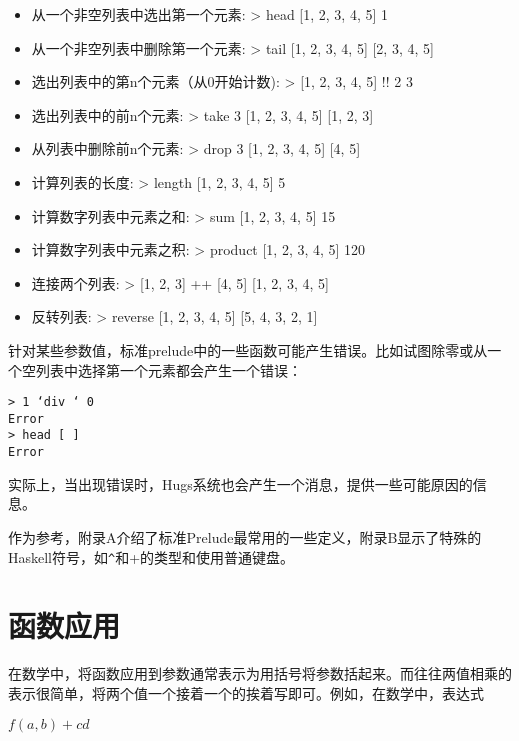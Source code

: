 \begin{itemize}
\item 从一个非空列表中选出第一个元素:
> head [1, 2, 3, 4, 5]
1

\item 从一个非空列表中删除第一个元素:
> tail [1, 2, 3, 4, 5]
[2, 3, 4, 5]

\item 选出列表中的第n个元素（从0开始计数):
> [1, 2, 3, 4, 5] !! 2
3

\item 选出列表中的前n个元素:
> take 3 [1, 2, 3, 4, 5]
[1, 2, 3]

\item 从列表中删除前n个元素:
> drop 3 [1, 2, 3, 4, 5]
[4, 5]

\item 计算列表的长度:
> length [1, 2, 3, 4, 5]
5

\item 计算数字列表中元素之和:
> sum [1, 2, 3, 4, 5]
15

\item 计算数字列表中元素之积:
> product [1, 2, 3, 4, 5]
120

\item 连接两个列表:
> [1, 2, 3] ++ [4, 5]
[1, 2, 3, 4, 5]

\item 反转列表:
> reverse [1, 2, 3, 4, 5]
[5, 4, 3, 2, 1]

\end{itemize}

针对某些参数值，标准prelude中的一些函数可能产生错误。比如试图除零或从一个空列表中选择第一个元素都会产生一个错误：
\begin{verbatim}
> 1 ‘div ‘ 0
Error
> head [ ]
Error
\end{verbatim}

实际上，当出现错误时，Hugs系统也会产生一个消息，提供一些可能原因的信息。

作为参考，附录A介绍了标准Prelude最常用的一些定义，附录B显示了特殊的Haskell符号，如\verb|^|和+的类型和使用普通键盘。

\section{函数应用}

在数学中，将函数应用到参数通常表示为用括号将参数括起来。而往往两值相乘的表示很简单，将两个值一个接着一个的挨着写即可。例如，在数学中，表达式

$f (a, b) + c d$

